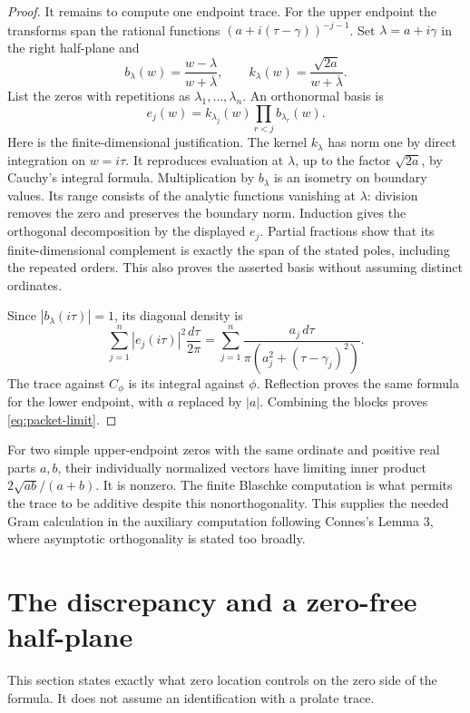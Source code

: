 \begin{proof}
It remains to compute one endpoint trace. For the upper endpoint
the transforms span the rational functions
$(a+i(\tau-\gamma))^{-j-1}$. Set $\lambda=a+i\gamma$ in the
right half-plane and
\[
 b_\lambda(w)=\frac{w-\lambda}{w+\overline\lambda},\qquad
 k_\lambda(w)=\frac{\sqrt{2a}}{w+\overline\lambda}.
\]
List the zeros with repetitions as $\lambda_1,\ldots,\lambda_n$.
An orthonormal basis is
\[
 e_j(w)=k_{\lambda_j}(w)\prod_{r<j}b_{\lambda_r}(w).
\]
Here is the finite-dimensional justification. The kernel
$k_\lambda$ has norm one by direct integration on $w=i\tau$.
It reproduces evaluation at $\lambda$, up to the factor
$\sqrt{2a}$, by Cauchy's integral formula. Multiplication by
$b_\lambda$ is an isometry on boundary values. Its range consists
of the analytic functions vanishing at $\lambda$: division removes
the zero and preserves the boundary norm. Induction gives the
orthogonal decomposition by the displayed $e_j$. Partial fractions
show that its finite-dimensional complement is exactly the span of
the stated poles, including the repeated orders. This also proves
the asserted basis without assuming distinct ordinates.

Since $|b_\lambda(i\tau)|=1$, its diagonal density is
\[
 \sum_{j=1}^n |e_j(i\tau)|^2\frac{d\tau}{2\pi}
 =\sum_{j=1}^n\frac{a_j\,d\tau}
               {\pi(a_j^2+(\tau-\gamma_j)^2)}.
\]
The trace against $C_\phi$ is its integral against $\phi$.
Reflection proves the same formula for the lower endpoint, with
$a$ replaced by $|a|$. Combining the blocks proves
\eqref{eq:packet-limit}.
\end{proof}

\begin{remark}
For two simple upper-endpoint zeros with the same ordinate and
positive real parts $a,b$, their individually normalized vectors
have limiting inner product $2\sqrt{ab}/(a+b)$. It is nonzero.
The finite Blaschke computation is what permits the trace to be
additive despite this nonorthogonality. This supplies the needed
Gram calculation in the auxiliary computation following Connes's
Lemma 3, where asymptotic orthogonality is stated too broadly.
\end{remark}

\section{The discrepancy and a zero-free half-plane}
This section states exactly what zero location controls on the zero
side of the formula. It does not assume an identification with a
prolate trace.


